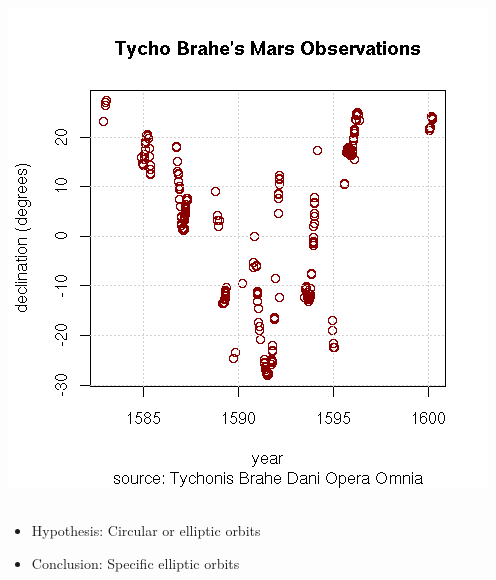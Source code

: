 \documentclass{beamer}
\begin{document}
\begin{frame}
\begin{columns}
\begin{column}{0.5\textwidth}
      \includegraphics[width=\columnwidth]{figures/tycho-observations}
    \end{column}
  \end{columns}
  \begin{itemize}
  \item Hypothesis: Circular \alert{or} elliptic orbits
  \item Conclusion: Specific \alert{elliptic} orbits
  \end{itemize}
\end{frame}

\end{document}
